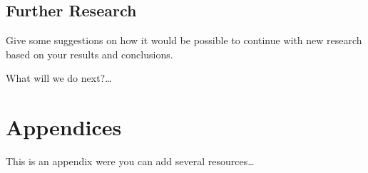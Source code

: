 \documentclass[a4paper, 12pt]{report}
\begin{document}
\section{Further Research}

\textcolor{jupurple}{
Give some suggestions on how it would be possible to continue with new research based on your results and conclusions.
}

\medskip
What will we do next?\dots

\medskip\lipsum[1]

\newpage
\printbibliography


\newpage


\printglossaries


\newpage

\chapter{Appendices}

This is an appendix were you can add several resources\dots

\medskip
\lipsum[1]


\newpage
{}
\listoftables




\newpage
{}
\listoffigures




\newpage
{
}
\end{document}
